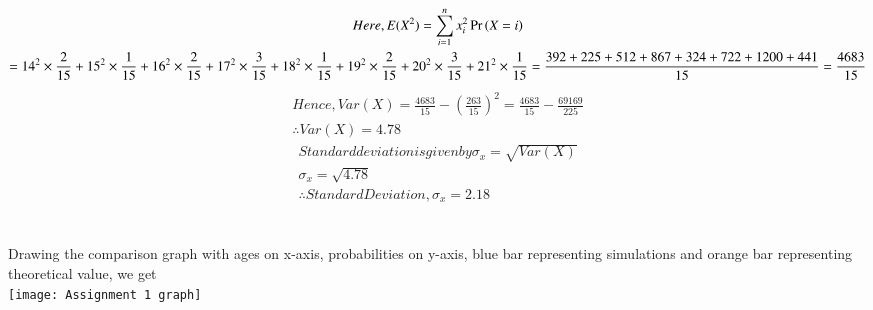 \documentclass[journal,12pt,twocolumn]{IEEEtran}
\begin{document}
\begin{multline}
    
    Here, E(X^2) = \sum_{i=1}^n x_i^2 \pr{X=i}\\
     =  14^2 \times \frac{2}{15} + 15^2 \times \frac{1}{15} + 16^2 \times \frac{2}{15} + 17^2 \times \frac{3}{15} + 18^2 \times \frac{1}{15} + 19^2 \times \frac{2}{15} + 20^2 \times \frac{3}{15} + 21^2 \times \frac{1}{15}
     =\frac{392+225+512+867+324+722+1200+441}{15}
     =\frac{4683}{15}
\end{multline}
\begin{multline*}
    Hence, Var (X) = \frac{4683}{15} - (\frac{263}{15})^2
    = \frac{4683}{15} - \frac{69169}{225}
    \\\therefore Var (X) = 4.78
\end{multline*}
\begin{align*}
     
     Standard deviation is given by \sigma_x = \sqrt{Var(X)}
     \\\sigma_x = \sqrt{4.78}
     \\\therefore {Standard Deviation, \sigma_x = 2.18}
\end{align*}
\hline
\\\\Drawing the comparison graph with ages on x-axis, probabilities on y-axis, blue bar representing simulations and orange bar representing theoretical value, we get
\\\texttt{[image: Assignment 1 graph]}
\end{document}

